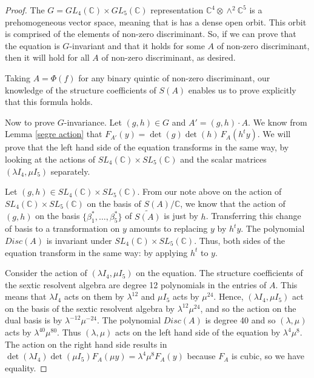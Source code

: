 \documentclass{article}
\begin{document}
\begin{proof}
The $G = GL_4(\mathbb{C}) \times GL_5(\mathbb{C})$ representation $\mathbb{C}^4 \otimes \wedge^2 \mathbb{C}^5$ is a prehomogeneous vector space, meaning that is has a dense open orbit.  This orbit is comprised of the elements of non-zero discriminant.  So, if we can prove that the equation is $G$-invariant and that it holds for some $A$ of non-zero discriminant, then it will hold for all $A$ of non-zero discriminant, as desired.

Taking $A = \Phi(f)$ for any binary quintic of non-zero discriminant, our knowledge of the structure coefficients of $S(A)$ enables us to prove explicitly that this formula holds.

Now to prove $G$-invariance.  Let $(g,h) \in G$ and $A' = (g,h) \cdot A$.  We know from Lemma \ref{segre action} that $F_{A'}(y) = \det(g) \det(h) \, F_A(h^t y)$.  We will prove that the left hand side of the equation transforms in the same way, by looking at the actions of $SL_4(\mathbb{C}) \times SL_5(\mathbb{C})$ and the scalar matrices $(\lambda I_4,\mu I_5)$ separately.

Let $(g,h) \in SL_4(\mathbb{C}) \times SL_5(\mathbb{C})$.  From our note above on the action of $SL_4(\mathbb{C}) \times SL_5(\mathbb{C})$ on the basis of $S(A)/\mathbb{C}$, we know that the action of $(g,h)$ on the basis $\{\beta_1^*,\ldots,\beta_5^*\}$ of $\tilde{S(A)}$ is just by $h$.  Transferring this change of basis to a transformation on $y$ amounts to replacing $y$ by $h^t y$.  The polynomial $Disc(A)$ is invariant under $SL_4(\mathbb{C}) \times SL_5(\mathbb{C})$.  Thus, both sides of the equation transform in the same way: by applying $h^t$ to $y$.

Consider the action of $(\lambda I_4,\mu I_5)$ on the equation.  The structure coefficients of the sextic resolvent algebra are degree 12 polynomials in the entries of $A$.  This means that $\lambda I_4$ acts on them by $\lambda^{12}$ and $\mu I_5$ acts by $\mu^{24}$.  Hence, $(\lambda I_4, \mu I_5)$ act on the basis of the sextic resolvent algebra by $\lambda^{12} \mu^{24}$, and so the action on the dual basis is by $\lambda^{-12} \mu^{-24}$.  The polynomial $Disc(A)$ is degree 40 and so $(\lambda,\mu)$ acts by $\lambda^{40} \mu^{80}$.  Thus $(\lambda,\mu)$ acts on the left hand side of the equation by $\lambda^4 \mu^8$.  The action on the right hand side results in $\det(\lambda I_4) \det (\mu I_5) F_A(\mu y) = \lambda^4 \mu^8 F_A(y)$ because $F_A$ is cubic, so we have equality.
\end{proof}
\end{document}
